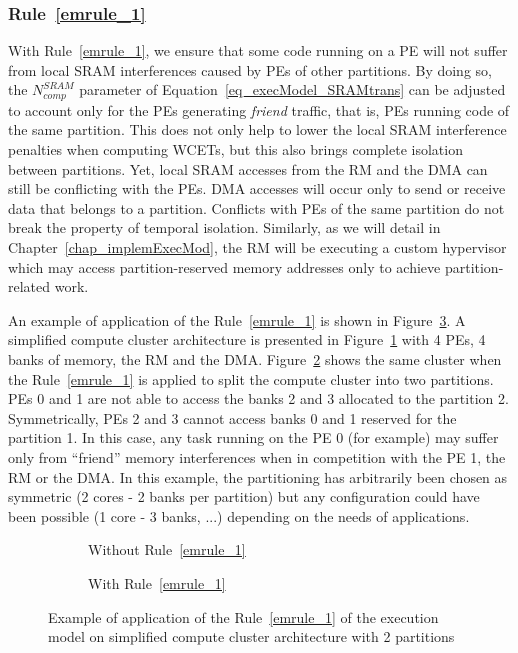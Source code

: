 \documentclass[main.tex]{subfiles}
\begin{document}
\subsubsection{Rule~\ref{emrule_1}}
With Rule~\ref{emrule_1}, we ensure that some code running on a PE will not suffer from local SRAM interferences caused by PEs of other partitions. By doing so, the $N_{comp}^{SRAM}$ parameter of Equation~\ref{eq_execModel_SRAMtrans} can be adjusted to account only for the PEs generating \emph{friend} traffic, that is, PEs running code of the same partition. This does not only help to lower the local SRAM interference penalties when computing WCETs, but this also brings complete isolation between partitions.
Yet, local SRAM accesses from the RM and the DMA can still be conflicting with the PEs. DMA accesses will occur only to send or receive data that belongs to a partition. Conflicts with PEs of the same partition do not break the property of temporal isolation. Similarly, as we will detail in Chapter~\ref{chap_implemExecMod}, the RM will be executing a custom hypervisor which may access partition-reserved memory addresses only to achieve partition-related work.

\begin{example}
    An example of application of the Rule~\ref{emrule_1} is shown in Figure~\ref{fig_execModel_exampleRule1}. A simplified compute cluster architecture is presented in Figure~\ref{fig_execModel_exampleRule1_before} with 4 PEs, 4 banks of memory, the RM and the DMA. Figure~\ref{fig_execModel_exampleRule1_after} shows the same cluster when the Rule~\ref{emrule_1} is applied to split the compute cluster into two partitions. PEs 0 and 1 are not able to access the banks 2 and 3 allocated to the partition 2. Symmetrically, PEs 2 and 3 cannot access banks 0 and 1 reserved for the partition 1. In this case, any task running on the PE 0 (for example) may suffer only from ``friend'' memory interferences when in competition with the PE 1, the RM or the DMA. In this example, the partitioning has arbitrarily been chosen as symmetric (2 cores - 2 banks per partition) but any configuration could have been possible (1 core - 3 banks, ...) depending on the needs of applications.
\end{example}

\begin{figure}
    \centering
    \begin{subfigure}[b]{0.45\linewidth}
    \centering
        \scalebox{0.7}{}
        \caption{Without Rule~\ref{emrule_1}}
        \label{fig_execModel_exampleRule1_before}
    \end{subfigure}
    \begin{subfigure}[b]{0.45\linewidth}
    \centering
        \scalebox{0.7}{}
        \caption{With Rule~\ref{emrule_1}}
        \label{fig_execModel_exampleRule1_after}
    \end{subfigure}
    \caption{Example of application of the Rule~\ref{emrule_1} of the execution model on simplified compute cluster architecture with 2 partitions}
    \label{fig_execModel_exampleRule1}
\end{figure}
\end{document}
